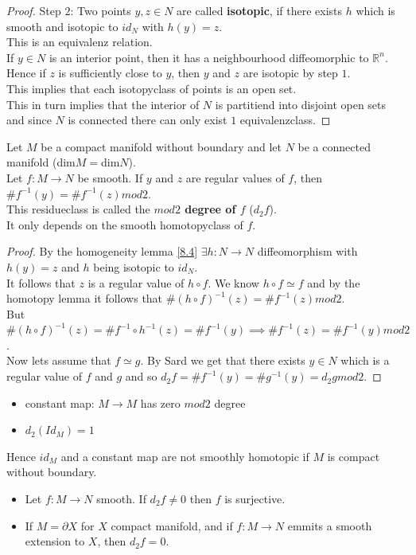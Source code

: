 \begin{proof}
    Step $2$: Two points $y,z\in N$ are called \textbf{isotopic}, if there exists $h$ which is smooth and isotopic to $id_N$ with $h(y)=z$.\\
    This is an equivalenz relation.\\
    If $y\in N$ is an interior point, then it has a neighbourhood diffeomorphic to $\mathbb{R}^n$.\\
    Hence if $z$ is sufficiently close to $y$, then $y$ and $z$ are isotopic by step $1$.\\
    This implies that each isotopyclass of points is an open set.\\
    This in turn implies that the interior of $N$ is partitiend into disjoint open sets and since $N$ is connected there can only exist $1$ equivalenzclass.
\end{proof}
\begin{theorem}\label{8.5}
    Let $M$ be a compact manifold without boundary and let $N$ be a connected manifold (dim$M=$dim$N$).\\
    Let $f:M\to N$ be smooth. If $y$ and $z$ are regular values of $f$, then $\#f^{-1}(y)=\#f^{-1}(z) mod 2$.\\
    This residueclass is called the \textbf{$mod 2$ degree of $f$} ($d_2f$).\\
    It only depends on the smooth homotopyclass of $f$.
\end{theorem}
\begin{proof}
    By the homogeneity lemma \ref{8.4} $\exists h:N\to N$ diffeomorphism with $h(y)=z$ and $h$ being isotopic to $id_N$.\\
    It follows that $z$ is a regular value of $h\circ f$. We know $h\circ f\simeq f$ and by the homotopy lemma it follows that $\#(h\circ f)^{-1}(z)=\#f^{-1}(z) mod 2$.\\
    But $\#(h\circ f)^{-1}(z)=\#f^{-1}\circ h^{-1}(z)=\#f^{-1}(y)\implies \#f^{-1}(z)=\#f^{-1}(y) mod 2$.\\
    Now lets assume that $f\simeq g$. By Sard we get that there exists $y\in N$ which is a regular value of $f$ and $g$ and so $d_2f=\#f^{-1}(y)=\#g^{-1}(y)=d_2g mod 2$.
\end{proof}
\begin{example}\label{8.6}
    \begin{itemize}
        \item constant map: $M\to M$ has zero $mod 2$ degree
        \item $d_2(Id_M)=1$
    \end{itemize}
    Hence $id_M$ and a constant map are not smoothly homotopic if $M$ is compact without boundary.
    \begin{itemize}
        \item Let $f:M\to N$ smooth. If $d_2f\neq 0$ then $f$ is surjective.
        \item If $M=\partial X$ for $X$ compact manifold, and if $f:M\to N$ emmits a smooth extension to $X$, then $d_2f=0$.
    \end{itemize}
\end{example}
